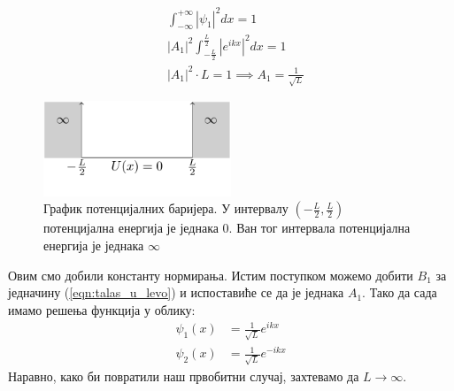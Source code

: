 \documentclass{tufte-handout} %
\theoremstyle{definition}
\theoremstyle{remark}
\begin{document}
\begin{align*}
	&\displaystyle\int_{-\infty}^{+\infty}|\psi_1|^2dx =1\\
	&\displaystyle|A_1|^2\int_{-\frac{L}{2}}^{\frac{L}{2}}|e^{ikx}|^2dx= 1\\
	&|A_1|^2 \cdot L = 1 \implies A_1 = \frac{1}{\sqrt{L}}
\end{align*}
\begin{figure}
	\centering
	\includegraphics[width=0.5\textwidth]{beskonacne_barijere.png}
	\caption{График потенцијалних баријера. У интервалу $\left(-\frac{L}{2}, \frac{L}{2}\right)$ потенцијална енергија је једнака 0. Ван тог интервала потенцијална енергија је једнака $\infty$}
\end{figure}
Овим смо добили константу нормирања. Истим поступком можемо добити $B_1$ за једначину (\ref{eqn:talas_u_levo}) и испоставиће се да је једнака $A_1$. Тако да сада имамо решења функција у облику:
\begin{align}
		\psi_1(x)&=\frac{1}{\sqrt{L}}e^{ikx}\\
		\psi_2(x)&=\frac{1}{\sqrt{L}}e^{-ikx} 
\end{align}
Наравно, како би повратили наш првобитни случај, захтевамо да $L\rightarrow\infty$. 
\end{document}

